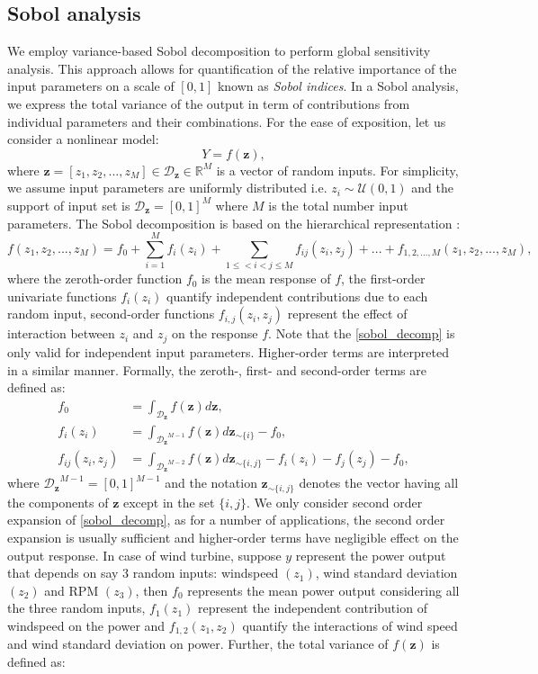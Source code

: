 \documentclass[review]{elsarticle}
\numberwithin{equation}{section}
\numberwithin{equation}{section}
\begin{document}
\subsection{Sobol analysis}
We employ variance-based Sobol decomposition to perform global sensitivity analysis. This approach allows for quantification of the relative importance of the input parameters on a scale of $[0,1]$ known as \emph{Sobol indices}. In a Sobol analysis, we express the total variance of the output in term of contributions from individual parameters and their combinations. For the ease of exposition, let us consider a nonlinear model:
\begin{equation}\label{nonlinear_model}
Y = f({\mathbf{z}}),
\end{equation}
where ${\mathbf{z}} = [z_1, z_2, ..., z_M]\in \mathcal{D}_{\mathbf{z}}\in \mathbb{R}^M$ is a vector of random inputs. For simplicity, we assume input parameters are uniformly distributed i.e. $z_i \sim \mathcal{U}(0,1)$ and the support of input set is $\mathcal{D}_{\mathbf{z}} = [0,1]^M$ where $M$ is the total number input parameters. The Sobol decomposition is based on the hierarchical representation \cite{RSmith}:
\begin{equation}\label{sobol_decomp}
f(z_1, z_2, ..., z_M) = f_0+\sum_{i=1}^M f_i(z_i) + \sum_{1\leq<i<j\leq M} f_{ij}(z_i,z_j) + ... + f_{1, 2, ..., M}(z_1, z_2, ..., z_M),
\end{equation}
where the zeroth-order function $f_0$ is the mean response of $f$, the first-order univariate functions $f_i(z_i)$ quantify independent contributions due to each random input, second-order functions $f_{i,j}(z_i,z_j)$ represent the effect of interaction between $z_i$ and $z_j$ on the response $f$. Note that the \eqref{sobol_decomp} is only valid for independent input parameters. Higher-order terms are interpreted in a similar manner. Formally, the zeroth-, first- and second-order terms are defined as:
\begin{align}\label{sobol_terms}
f_0 &= \int_{\mathcal{D}_{\mathbf{z}}}f(\mathbf{z})d\mathbf{z},\\
f_i(z_i) &= \int_{{\mathcal{D}_{\mathbf{z}}}^{M-1}}f(\mathbf{z})d\mathbf{z}_{\sim \{i\}} - f_0,\\
f_{ij}(z_i,z_j) &= \int_{{\mathcal{D}_{\mathbf{z}}}^{M-2}}f(\mathbf{z})d\mathbf{z}_{\sim \{i,j\}} - f_i(z_i) - f_j(z_j) - f_0,
\end{align}
where ${\mathcal{D}_{\mathbf{z}}}^{M-1} = [0,1]^{M-1}$ and the notation $\mathbf{z}_{\sim \{i,j\}}$ denotes the vector having all the components of $\mathbf{z}$ except in the set $\{i,j\}$. We only consider second order expansion of \eqref{sobol_decomp}, as for a number of applications, the second order expansion is usually sufficient and higher-order terms have negligible effect on the output response. In case of wind turbine, suppose $y$ represent the power output that depends on say 3 random inputs: windspeed $(z_1)$, wind standard deviation $(z_2)$ and RPM $(z_3)$, then $f_0$ represents the mean power output considering all the three random inputs, $f_1(z_1)$ represent the independent contribution of windspeed on the power and $f_{1,2}(z_1,z_2)$ quantify the interactions of wind speed and wind standard deviation on power. Further, the total variance of $f(\mathbf{z})$ is defined as:
\end{document}
